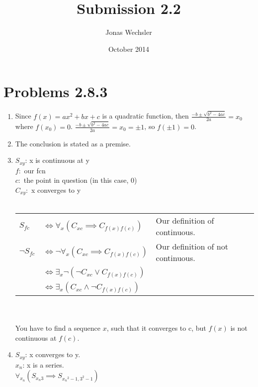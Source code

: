 \documentclass{article}
\title{Submission 2.2}
\author{Jonas Wechsler}
\date{October 2014}
\begin{document}
	\maketitle
	\section{Problems 2.8.3}
	\begin{enumerate}
		\item
			Since $f(x) = ax^2 + bx + c$ is a quadratic function, then $\frac{-b \pm \sqrt{b^2-4ac}}{2a} = x_0$ where $f(x_0) = 0$. $\frac{-b \pm \sqrt{b^2-4ac}}{2a} = x_0 = \pm 1$, so $f(\pm 1) = 0$.
		\item
			The conclusion is stated as a premise.
		\item
			$S_{xy}$: x is continuous at y\\
			$f:$ our fcn\\
			$c:$ the point in question (in this case, 0)\\
			$C_{xy}:$ x converges to y\\
			\\
			\begin{tabular}{l l l}
				$S_{fc}$ & $\iff \forall _x (C_{xc} \implies C_{f(x)f(c)})$ & Our definition of continuous.\\
				$\lnot S_{fc}$ & $\iff \lnot \forall _x (C_{xc} \implies C_{f(x)f(c)})$ & Our definition of not continuous.\\
				& $\iff \exists _x \lnot(\lnot C_{xc} \lor C_{f(x)f(c)})$\\
				& $\iff \exists _x (C_{xc} \land \lnot C_{f(x)f(c)})$\\
			\end{tabular}\\
			\\
			You have to find a sequence $x$, such that it converges to c, but $f(x)$ is not continuous at $f(c)$.
		\item
			$S_{xy}$: x converges to y.\\
			$x_n$: x is a series.\\
			$\forall _{x_n}(S_{x_n 3} \implies S_{{x_n}^2-1, 3^2-1})$
	\end{enumerate}
\end{document}
